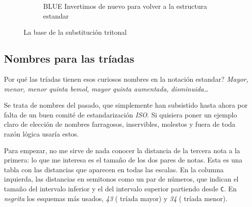 \documentclass[]{article}
\begin{document}
\begin{figure}[H]
\begin{subfigure}{0.30\textwidth}
	  \end{subfigure}
	  \hfill	
	  \begin{subfigure}{0.30\textwidth}
		\centering
		\caption{\textsf{BLUE} Invertimos de nuevo para volver a la estructura estandar}
		
	  \end{subfigure}
	  \hfill	
    \caption{La base de la substitución tritonal}\label{fig:tritonal-substitution}
	\end{figure}

  
\subsection{Nombres para las tríadas}

Por qué las tríadas tienen esos curiosos nombres en la notación estandar? \emph{Mayor, menor, menor quinta bemol, mayor quinta   aumentada, disminuida\ldots{}}

Se trata de nombres del pasado, que simplemente han subsistido hasta ahora por falta de un buen comité de estandarización \emph{ISO}. Si quisiera poner un ejemplo claro de elección de nombres farragosos, inservibles, molestos y fuera de toda razón lógica usaría estos.

Para empezar, no me sirve de nada conocer la distancia de la tercera nota a la primera: lo que me interesa es el tamaño de los dos pares de notas. Esta es una tabla con las distancias que aparecen en todas las escalas. En la columna izquierda, las distancias en semitonos como un par de números, que indican el tamaño del intervalo inferior y el del intervalo superior partiendo desde \texttt{C}. En \emph{negrita} los esquemas más usados, \emph{43} ( tríada mayor) y \emph{34} ( tríada menor).
\end{document}
